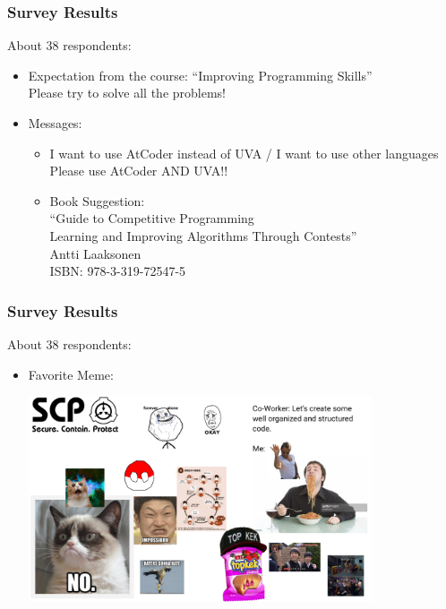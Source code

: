 \documentclass{beamer}
\begin{document}
\begin{frame}
  \frametitle{Survey Results}
  About 38 respondents:

  \begin{itemize}
  \item Expectation from the course: ``Improving Programming Skills''\\
    \medskip
    Please try to solve all the problems!
    \bigskip

  \item Messages:
    \begin{itemize}
    \item I want to use AtCoder instead of UVA / I want to use other languages\\
      Please use AtCoder AND UVA!!
      
      \medskip
      
    \item Book Suggestion:\\      
      ``Guide to Competitive Programming\\
      Learning and Improving Algorithms Through Contests''\\
      Antti Laaksonen\\
      ISBN: 978-3-319-72547-5
    \end{itemize}
    
  \end{itemize}
\end{frame}
\begin{frame}
  \frametitle{Survey Results}
  About 38 respondents:
  \begin{itemize}
  \item Favorite Meme:\\
    \begin{center}
      \includegraphics[width=0.8\textwidth]{img/meme2018}
    \end{center}
  \end{itemize}
\end{frame}
\end{document}
